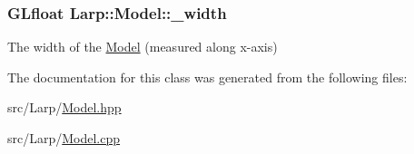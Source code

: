 \subsubsection[{\texorpdfstring{\+\_\+width}{_width}}]{\setlength{\rightskip}{0pt plus 5cm}G\+Lfloat Larp\+::\+Model\+::\+\_\+width\hspace{0.3cm}{\ttfamily [private]}}\hypertarget{classLarp_1_1Model_a9663e0b21638f43840df65980ee3424f}{}\label{classLarp_1_1Model_a9663e0b21638f43840df65980ee3424f}
The width of the \hyperlink{classLarp_1_1Model}{Model} (measured along x-\/axis) 

The documentation for this class was generated from the following files\+:\begin{DoxyCompactItemize}
\item 
src/\+Larp/\hyperlink{Model_8hpp}{Model.\+hpp}\item 
src/\+Larp/\hyperlink{Model_8cpp}{Model.\+cpp}\end{DoxyCompactItemize}
